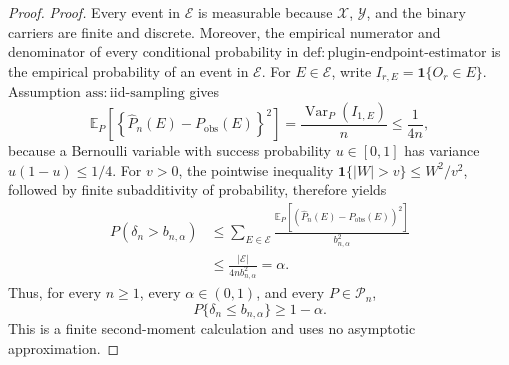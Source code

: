 \documentclass{article}
\begin{document}
\begin{proof}
\noindent\textit{Proof.}
Every event in \(\mathcal E\) is measurable because \(\mathcal X\), \(\mathcal Y\), and the binary carriers are finite and discrete.  Moreover, the empirical numerator and denominator of every conditional probability in \(\mathrm{def{:}plugin\text{-}endpoint\text{-}estimator}\) is the empirical probability of an event in \(\mathcal E\).  For \(E\in\mathcal E\), write \(I_{r,E}=\mathbf 1\{O_r\in E\}\).  Assumption \(\mathrm{ass{:}iid\text{-}sampling}\) gives
\[
\mathbb E_P\!\left[
 \left\{\widehat P_n(E)-P_{\mathrm{obs}}(E)\right\}^{2}
 \right]
=\frac{\operatorname{Var}_P(I_{1,E})}{n}
\le \frac{1}{4n},
\tag{1}
\]
because a Bernoulli variable with success probability \(u\in[0,1]\) has variance \(u(1-u)\le1/4\).  For \(v>0\), the pointwise inequality \(\mathbf 1\{|W|>v\}\le W^2/v^2\), followed by finite subadditivity of probability, therefore yields
\[
\begin{aligned}
P(\delta_n>b_{n,\alpha})
&\le \sum_{E\in\mathcal E}
 \frac{\mathbb E_P[(\widehat P_n(E)-P_{\mathrm{obs}}(E))^2]}
      {b_{n,\alpha}^2}\\
&\le\frac{|\mathcal E|}{4n b_{n,\alpha}^2}=\alpha.
\end{aligned}
\tag{2}
\]
Thus, for every \(n\ge1\), every \(\alpha\in(0,1)\), and every \(P\in\mathcal P_n\),
\[
P\{\delta_n\le b_{n,\alpha}\}\ge1-\alpha.
\tag{3}
\]
This is a finite second-moment calculation and uses no asymptotic approximation.


\end{proof}
\end{document}
